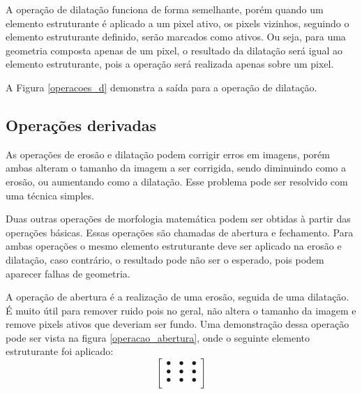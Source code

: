 \documentclass[conference,harvard,brazil,english]{sbatex}
\begin{document}
A operação de dilatação funciona de forma semelhante, porém quando um elemento estruturante é aplicado a um pixel ativo, os pixels vizinhos, seguindo o elemento estruturante definido, serão marcados como ativos. Ou seja, para uma geometria composta apenas de um pixel, o resultado da dilatação será igual ao elemento estruturante, pois a operação será realizada apenas sobre um pixel.

A Figura \ref{operacoes_d}  demonstra a saída para a operação de dilatação.
\subsection{Operações derivadas}
As operações de erosão e dilatação podem corrigir erros em imagens, porém ambas alteram o tamanho da imagem a ser corrigida, sendo diminuindo como a erosão, ou aumentando como a dilatação. Esse problema pode ser resolvido com uma técnica simples.

Duas outras operações de morfologia matemática podem ser obtidas à partir das operações básicas. Essas operações são chamadas de abertura e fechamento. Para ambas operações o mesmo elemento estruturante deve ser aplicado na erosão e dilatação, caso contrário, o resultado pode não ser o esperado, pois podem aparecer falhas de geometria.

A operação de abertura é a realização de uma erosão, seguida de uma dilatação. É muito útil para remover ruido pois no geral, não altera o tamanho da imagem e remove pixels ativos que deveriam ser fundo. Uma demonstração dessa operação pode ser vista na figura \ref{operacao_abertura}, onde o seguinte elemento estruturante foi aplicado: 
\[\begin{bmatrix}
    \bullet & \bullet & \bullet \\
    \bullet & \bullet & \bullet \\
    \bullet & \bullet & \bullet \\
\end{bmatrix}\]
\end{document}
